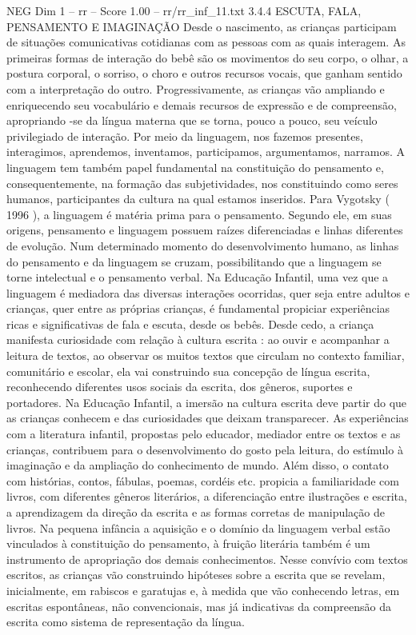 \begin{textsample}{NEG Dim 1 – rr – Score 1.00 – rr/rr\_inf\_11.txt}  \label{ex:f1_neg_073}
3.4.4 ESCUTA, FALA, PENSAMENTO E IMAGINAÇÃO Desde o nascimento, as crianças participam de situações comunicativas cotidianas com as pessoas com as quais interagem.
As primeiras formas de interação do bebê são os movimentos do seu corpo, o olhar, a postura corporal, o sorriso, o choro e outros recursos vocais, que ganham sentido com a interpretação do outro.
Progressivamente, as crianças vão ampliando e enriquecendo seu vocabulário e demais recursos de expressão e de compreensão, apropriando -se da língua materna que se torna, pouco a pouco, seu veículo privilegiado de interação.
Por meio da linguagem, nos fazemos presentes, interagimos, aprendemos, inventamos, participamos, argumentamos, narramos.
A linguagem tem também papel fundamental na constituição do pensamento e, consequentemente, na formação das subjetividades, nos constituindo como seres humanos, participantes da cultura na qual estamos inseridos.
Para Vygotsky ( 1996 ), a linguagem é matéria prima para o pensamento.
Segundo ele, em suas origens, pensamento e linguagem possuem raízes diferenciadas e linhas diferentes de evolução.
Num determinado momento do desenvolvimento humano, as linhas do pensamento e da linguagem se cruzam, possibilitando que a linguagem se torne intelectual e o pensamento verbal.
Na Educação Infantil, uma vez que a linguagem é mediadora das diversas interações ocorridas, quer seja entre adultos e crianças, quer entre as próprias crianças, é fundamental propiciar experiências ricas e significativas de fala e escuta, desde os bebês.
Desde cedo, a criança manifesta curiosidade com relação à cultura escrita : ao ouvir e acompanhar a leitura de textos, ao observar os muitos textos que circulam no contexto familiar, comunitário e escolar, ela vai construindo sua concepção de língua escrita, reconhecendo diferentes usos sociais da escrita, dos gêneros, suportes e portadores.
Na Educação Infantil, a imersão na cultura escrita deve partir do que as crianças conhecem e das curiosidades que deixam transparecer.
As experiências com a literatura infantil, propostas pelo educador, mediador entre os textos e as crianças, contribuem para o desenvolvimento do gosto pela leitura, do estímulo à imaginação e da ampliação do conhecimento de mundo.
Além disso, o contato com histórias, contos, fábulas, poemas, cordéis etc. propicia a familiaridade com livros, com diferentes gêneros literários, a diferenciação entre ilustrações e escrita, a aprendizagem da direção da escrita e as formas corretas de manipulação de livros.
Na pequena infância a aquisição e o domínio da linguagem verbal estão vinculados à constituição do pensamento, à fruição literária também é um instrumento de apropriação dos demais conhecimentos.
Nesse convívio com textos escritos, as crianças vão construindo hipóteses sobre a escrita que se revelam, inicialmente, em rabiscos e garatujas e, à medida que vão conhecendo letras, em escritas espontâneas, não convencionais, mas já indicativas da compreensão da escrita como sistema de representação da língua.

\end{textsample}
